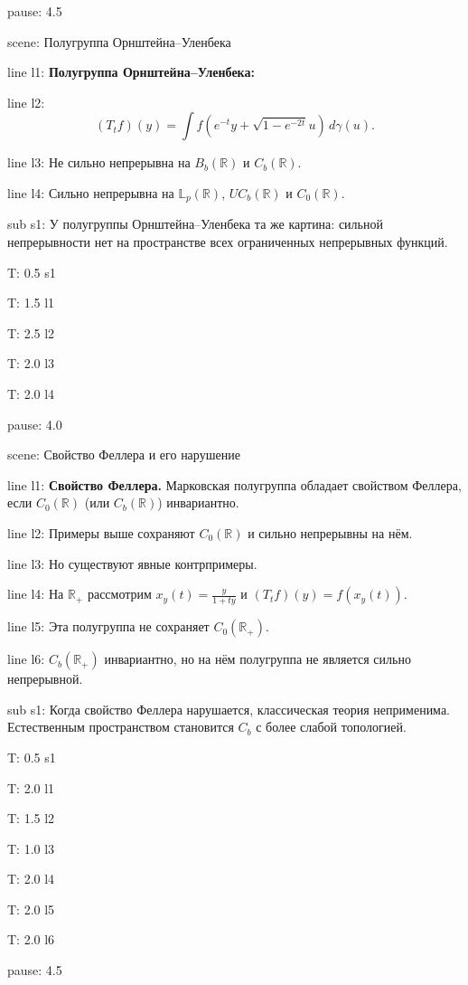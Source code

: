 \documentclass[a4paper,11pt]{article}
\newcommand{\R}{\mathbb{R}}
\newcommand{\Lp}{\mathbb{L}}
\begin{document}
pause: 4.5



scene: {Полугруппа Орнштейна--Уленбека}

line l1: {\textbf{Полугруппа Орнштейна--Уленбека:}}

line l2: {$$(T_t f)(y)=\int f(e^{-t}y+\sqrt{1-e^{-2t}}u)\,d\gamma(u).$$}

line l3: {Не сильно непрерывна на $B_b(\R)$ и $C_b(\R)$.}

line l4: {Сильно непрерывна на $\Lp_p(\R)$, $UC_b(\R)$ и $C_0(\R)$.}


sub s1: {У полугруппы Орнштейна--Уленбека та же картина: сильной непрерывности нет на пространстве всех ограниченных непрерывных функций.}


T: 0.5 s1

T: 1.5 l1

T: 2.5 l2

T: 2.0 l3

T: 2.0 l4

pause: 4.0



scene: {Свойство Феллера и его нарушение}

line l1: {\textbf{Свойство Феллера.} Марковская полугруппа обладает свойством Феллера,\\ если $C_0(\R)$ (или $C_b(\R)$) инвариантно.}

line l2: {Примеры выше сохраняют $C_0(\R)$ и сильно непрерывны на нём.}

line l3: {Но существуют явные контрпримеры.}

line l4: {На $\R_+$ рассмотрим $x_y(t)=\frac{y}{1+ty}$ и $(T_t f)(y)=f(x_y(t))$.}

line l5: {Эта полугруппа не сохраняет $C_0(\R_+)$.}

line l6: {$C_b(\R_+)$ инвариантно, но на нём полугруппа не является сильно непрерывной.}


sub s1: {Когда свойство Феллера нарушается, классическая теория неприменима. Естественным пространством становится $C_b$ с более слабой топологией.}


T: 0.5 s1

T: 2.0 l1

T: 1.5 l2

T: 1.0 l3

T: 2.0 l4

T: 2.0 l5

T: 2.0 l6

pause: 4.5
\end{document}
